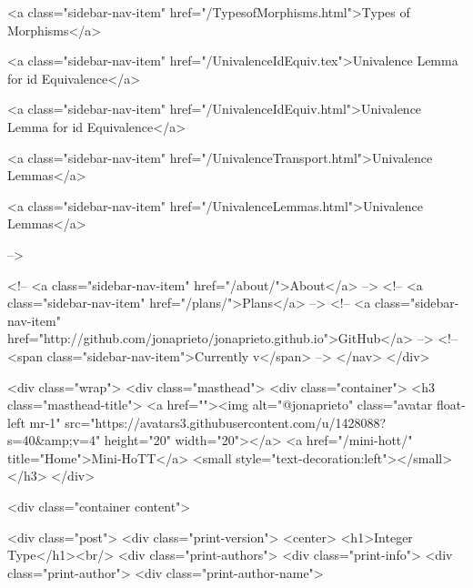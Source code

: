       
    
      
        
          <a class="sidebar-nav-item" href="/TypesofMorphisms.html">Types of Morphisms</a>
        
      
    
      
        
          <a class="sidebar-nav-item" href="/UnivalenceIdEquiv.tex">Univalence Lemma for id Equivalence</a>
        
      
    
      
        
          <a class="sidebar-nav-item" href="/UnivalenceIdEquiv.html">Univalence Lemma for id Equivalence</a>
        
      
    
      
        
          <a class="sidebar-nav-item" href="/UnivalenceTransport.html">Univalence Lemmas</a>
        
      
    
      
        
          <a class="sidebar-nav-item" href="/UnivalenceLemmas.html">Univalence Lemmas</a>
        
      
     -->

    <!-- <a class="sidebar-nav-item" href="/about/">About</a> -->
    <!-- <a class="sidebar-nav-item" href="/plans/">Plans</a> -->
    <!-- <a class="sidebar-nav-item" href="http://github.com/jonaprieto/jonaprieto.github.io">GitHub</a> -->
    <!-- <span class="sidebar-nav-item">Currently v</span> -->
  </nav>
</div>

    <div class="wrap">
      <div class="masthead">
        <div class="container">
          <h3 class="masthead-title">
            <a href=""><img alt="@jonaprieto" class="avatar float-left mr-1" src="https://avatars3.githubusercontent.com/u/1428088?s=40&amp;v=4" height="20" width="20"></a>
            <a href="/mini-hott/" title="Home">Mini-HoTT</a>
            <small style="text-decoration:left"></small>
          </h3>
        </div>
      
      <div class="container content">
        







<div class="post">
  <div class="print-version">
    <center>
      <h1>Integer Type</h1><br/>
        <div class="print-authors">
          <div class="print-info">
            <div class="print-author">
              <div class="print-author-name">
                
